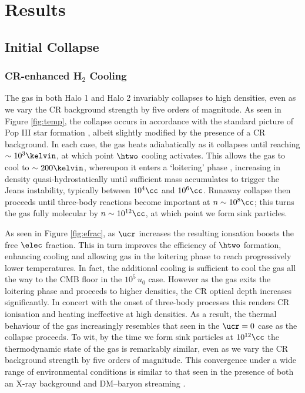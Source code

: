 \section{Results}
\label{sec:results}
\subsection{Initial Collapse}
\subsubsection{CR-enhanced H$_2$ Cooling}
\label{sec:initial_collapse}

The gas in both Halo 1 and Halo 2 invariably collapses to high densities, even as we vary the CR background strength by five orders of magnitude. As seen in Figure \ref{fig:temp}, the collapse occurs in accordance with the standard picture of Pop III star formation \citep[e.g.,][]{Greifetal2012,StacyBromm2013,Hiranoetal2014,Hosokawaetal2015}, albeit slightly modified by the presence of a CR background.  In each case, the gas heats adiabatically as it collapses until reaching $\sim10^3\kelvin$, at which point $\htwo$ cooling activates.  This allows the gas to cool to $\sim200\kelvin$, whereupon it enters a `loitering' phase \citep{BrommCoppiLarson2002}, increasing in density quasi-hydrostatically until sufficient mass accumulates to trigger the Jeans instability, typically between $10^4\cc$ and $10^6\cc$. Runaway collapse then proceeds until three-body reactions become important at $n\sim10^8\cc$; this turns the gas fully molecular by $n\sim10^{12}\cc$, at which point we form sink particles.

As seen in Figure \ref{fig:efrac}, as $\ucr$ increases the resulting ionsation boosts the free $\elec$ fraction.  This in turn improves the efficiency of $\htwo$ formation, enhancing cooling and allowing gas in the loitering phase to reach progressively lower temperatures. In fact, the additional cooling is sufficient to cool the gas all the way to the CMB floor in the $10^5\,u_0$ case. However as the gas exits the loitering phase and proceeds to higher densities, the CR optical depth increases significantly. In concert with the onset of three-body processes this renders CR ionisation and heating ineffective at high densities. As a result, the thermal behaviour of the gas increasingly resembles that seen in the $\ucr=0$ case as the collapse proceeds. To wit, by the time we form sink particles at  $10^{12}\cc$ the thermodynamic state of the gas is remarkably similar, even as we vary the CR background strength by five orders of magnitude. This convergence under a wide range of environmental conditions is similar to that seen in the presence of both an X-ray background \citep{Hummeletal2015} and DM--baryon streaming \citep{StacyBrommLoeb2011a,Greifetal2011b}.